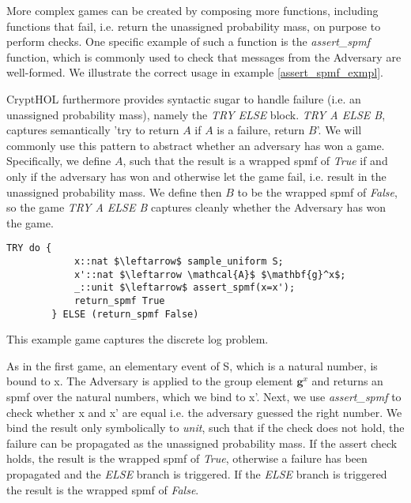 More complex games can be created by composing more functions, including functions that fail, i.e. return the unassigned probability mass, on purpose to perform checks. One specific example of such a function is the \textit{assert\_spmf} function, which is commonly used to check that messages from the Adversary are well-formed. We illustrate the correct usage in example \ref{assert_spmf_exmpl}. 

CryptHOL furthermore provides syntactic sugar to handle failure (i.e. an unassigned probability mass), namely the \textit{TRY ELSE} block. \textit{TRY A ELSE B}, captures semantically 'try to return $A$ if $A$ is a failure, return $B$'. We will commonly use this pattern to abstract whether an adversary has won a game. Specifically, we define $A$, such that the result is a wrapped spmf of \textit{True} if and only if the adversary has won and otherwise let the game fail, i.e. result in the unassigned probability mass. We define then $B$ to be the wrapped spmf of \textit{False}, so the game \textit{TRY A ELSE B} captures cleanly whether the Adversary has won the game.

\begin{example}
    \label{assert_spmf_exmpl}
    \hspace{0mm}
    \begin{lstlisting}[language=isabelle]
        TRY do {
            x::nat $\leftarrow$ sample_uniform S;
            x'::nat $\leftarrow \mathcal{A}$ $\mathbf{g}^x$;
            _::unit $\leftarrow$ assert_spmf(x=x');
            return_spmf True
        } ELSE (return_spmf False)
    \end{lstlisting}

    This example game captures the discrete log problem.

    As in the first game, an elementary event of S, which is a natural number, is bound to x. The Adversary is applied to the group element $\mathbf{g}^x$ and returns an spmf over the natural numbers, which we bind to x'.
    Next, we use \textit{assert\_spmf} to check whether x and x' are equal i.e. the adversary guessed the right number. We bind the result only symbolically to \textit{unit}, such that if the check does not hold, the failure can be propagated as the unassigned probability mass. If the assert check holds, the result is the wrapped spmf of \textit{True}, otherwise a failure has been propagated and the \textit{ELSE} branch is triggered. 
    If the \textit{ELSE} branch is triggered the result is the wrapped spmf of \textit{False}.

\end{example}